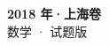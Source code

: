 \documentclass[zihao=-4, a4paper]{ctexart}
\begin{document}
\begin{center}
  {\Large\bfseries 2018 年·上海卷}\\[4pt]
  {\large 数学 · 试题版}
\end{center}
\medskip
{}

\end{document}
